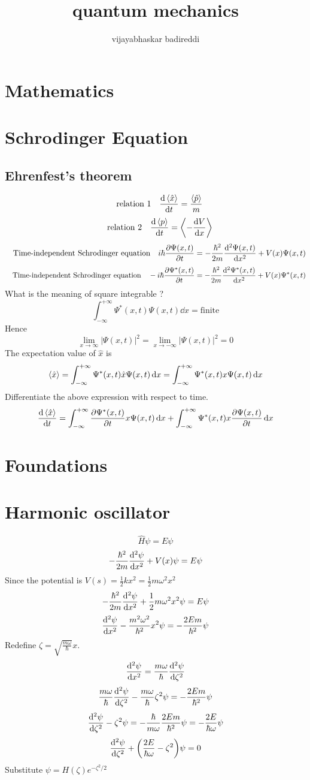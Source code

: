 \documentclass[12pt]{article}
\title{quantum mechanics}
\author{vijayabhaskar badireddi}
\begin{document}
\section{Mathematics}
\section{Schrodinger Equation}
\subsection{Ehrenfest's theorem}
\[\qq{relation 1}\dv{\expval{\hat{x}}}{t}=\frac{\expval{\hat{p}}}{m}\]
\[\qq{relation 2}\dv{\expval{p}}{t}=\expval{-\dv{V}{x}}\]
\[\qq{Time-independent Schrodinger equation}i\hbar\pdv{\Psi(x,t)}{t}=-\frac{\hbar^2}{2m}\dv[2]{\Psi(x,t)}{x}+V(x)\Psi(x,t)\]
\[\qq{Time-independent Schrodinger equation}-i\hbar\pdv{\Psi^*(x,t)}{t}=-\frac{\hbar^2}{2m}\dv[2]{\Psi^*(x,t)}{x}+V(x)\Psi^*(x,t)\]
What is the meaning of square integrable ?
\[\int_{-\infty}^{+\infty}\Psi^*(x,t)\Psi(x,t)\dd{x}=\text{finite}\]
Hence \[\lim_{x\to\infty}|\Psi(x,t)|^2=\lim_{x\to -\infty}|\Psi(x,t)|^2=0\]
The expectation value of $\hat{x}$ is \[\expval{\hat{x}}=\int_{-\infty}^{+\infty}\Psi^*(x,t)\hat{x}\Psi(x,t)\dd{x}=\int_{-\infty}^{+\infty}\Psi^*(x,t)x\Psi(x,t)\dd{x}\]
Differentiate the above expression with respect to time.
\[\dv{\expval{\hat{x}}}{t}=\int_{-\infty}^{+\infty}\pdv{\Psi^*(x,t)}{t}x\Psi(x,t)\dd{x}+\int_{-\infty}^{+\infty}\Psi^*(x,t)x\pdv{\Psi(x,t)}{t}\dd{x}\]

\section{Foundations}
\section{Harmonic oscillator}
\[\hat{H}\psi=E\psi\]
\[-\frac{\hbar^2}{2m}\dv[2]{\psi}{x}+V(x)\psi=E\psi\]
Since the potential is $V(s)=\frac{1}{2}kx^2=\frac{1}{2}m\omega^2x^2$
\[-\frac{\hbar^2}{2m}\dv[2]{\psi}{x}+\frac{1}{2}m\omega^2x^2\psi=E\psi\]
\[\dv[2]{\psi}{x}-\frac{m^2\omega^2}{\hbar^2}x^2\psi=-\frac{2Em}{\hbar^2}\psi\]
Redefine $\zeta=\sqrt{\frac{m\omega}{\hbar}}x$.
\[\dv[2]{\psi}{x}=\frac{m\omega}{\hbar}\dv[2]{\psi}{\zeta}\]
\[\frac{m\omega}{\hbar}\dv[2]{\psi}{\zeta}-\frac{m\omega}{\hbar}\zeta^2\psi=-\frac{2Em}{\hbar^2}\psi\]
\[\dv[2]{\psi}{\zeta}-\zeta^2\psi=-\frac{\hbar}{m\omega}\frac{2Em}{\hbar^2}\psi=-\frac{2E}{\hbar\omega}\psi\]
\[\dv[2]{\psi}{\zeta}+\qty(\frac{2E}{\hbar\omega}-\zeta^2)\psi=0\]
Substitute $\psi=H(\zeta)e^{-\zeta^2/2}$	
\end{document}
